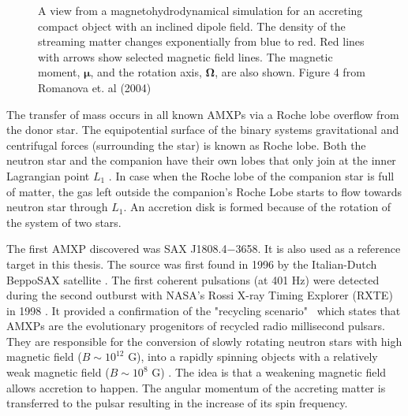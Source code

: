 \documentclass{wihuri}
\def\source{SAX J1808.4$-$3658}
\newcommand{\bmath}[1]{\boldsymbol{#1}}
\begin{document}
\begin{figure}
\centerline{} 
\caption{A view from a magnetohydrodynamical simulation for an accreting compact object with an inclined dipole field. The density of the streaming matter changes exponentially from blue to red. Red lines with arrows show selected magnetic field lines. The magnetic moment, $\bmath{\mu}$, and the rotation axis, $\bmath{\Omega}$, are also shown. Figure 4 from Romanova et. al (2004) \cite{romanova}} 
\label{fig:shcematic}
\end{figure}

The transfer of mass occurs in all known AMXPs via a Roche lobe overflow from the donor star. The equipotential surface of the binary systems gravitational and centrifugal forces (surrounding the star) is known as Roche lobe. Both the neutron star and the companion have their own lobes that only join at the inner Lagrangian point $L_{1}$ \cite{frank85}. %
In case when the Roche lobe of the companion star is full of matter, the gas left outside the companion's Roche Lobe starts to flow towards neutron star through $L_{1}$. An accretion disk is formed because of the rotation of the system of two stars.
 

The first AMXP discovered was \source. It is also used as a reference target in this thesis. %
The source was first found in 1996 by the Italian-Dutch BeppoSAX satellite \cite{zandsax1808}. %
The first coherent pulsations (at 401 Hz) were detected during the second outburst with NASA's Rossi X-ray Timing Explorer (RXTE) in 1998 \cite{wijnandssax1808}. %
It provided a confirmation of the "recycling scenario" \ which states that AMXPs are the evolutionary progenitors of recycled radio millisecond pulsars. They are responsible for the conversion of slowly rotating neutron stars with high magnetic field ($B \sim 10^{12}$ G), into a rapidly spinning objects with a relatively weak magnetic field ($B \sim 10^{8}$ G) \cite{patruno}. The idea is that a weakening magnetic field allows accretion to happen. The angular momentum of the accreting matter is transferred to the pulsar resulting in the increase of its spin frequency.%
\end{document}
